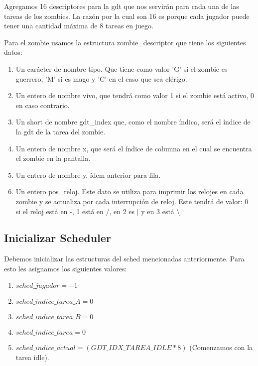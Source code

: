 \documentclass[a4paper]{article}
\begin{document}
Agregamos 16 descriptores para la gdt que nos servirán para cada una de las tareas de los zombies. La razón por la cual son 16 es porque cada jugador puede tener una cantidad máxima de 8 tareas en juego.

Para el zombie usamos la estructura zombie\_descriptor que tiene los siguientes datos:
\begin{enumerate}
    \item Un carácter de nombre tipo. Que tiene como valor 'G' si el zombie es guerrero, 'M' si es mago y 'C' en el caso que sea clérigo.

    \item Un entero de nombre vivo, que tendrá como valor 1 si el zombie está activo, 0 en caso contrario.

    \item Un short de nombre gdt\_index que, como el nombre índica, será el índice de la gdt de la tarea del zombie.

    \item Un entero de nombre x, que será el índice de columna en el cual se encuentra el zombie en la pantalla.

    \item Un entero de nombre y, ídem anterior para fila.

    \item Un entero pos\_reloj. Este dato se utiliza para imprimir los relojes en cada zombie y se actualiza por cada interrupción de reloj. Este tendrá de valor: 0 si el reloj está en -, 1 está en /, en 2 es $|$ y en 3 está \backslash. 
\end{enumerate}

\subsection{Inicializar Scheduler}

Debemos inicializar las estructuras del sched mencionadas anteriormente. Para esto les asignamos los siguientes valores:
\begin{enumerate}
    \item $sched\_jugador = -1$\;
    \item $sched\_indice\_tarea\_A = 0$\;
    \item $sched\_indice\_tarea\_B = 0$\;
    \item $sched\_indice\_tarea = 0$\;
    \item $sched\_indice\_actual = (GDT\_IDX\_TAREA\_IDLE * 8)$\; (Comenzamos con la tarea idle).  
\end{enumerate}
\end{document}
